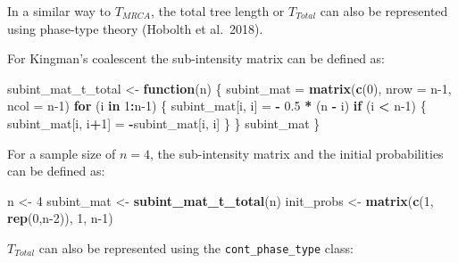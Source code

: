 \documentclass[]{article}
\newenvironment{Shaded}{\begin{snugshade}}{\end{snugshade}}
\newcommand{\ControlFlowTok}[1]{\textcolor[rgb]{0.13,0.29,0.53}{\textbf{#1}}}
\newcommand{\DataTypeTok}[1]{\textcolor[rgb]{0.13,0.29,0.53}{#1}}
\newcommand{\DecValTok}[1]{\textcolor[rgb]{0.00,0.00,0.81}{#1}}
\newcommand{\FloatTok}[1]{\textcolor[rgb]{0.00,0.00,0.81}{#1}}
\newcommand{\KeywordTok}[1]{\textcolor[rgb]{0.13,0.29,0.53}{\textbf{#1}}}
\newcommand{\NormalTok}[1]{#1}
\newcommand{\OperatorTok}[1]{\textcolor[rgb]{0.81,0.36,0.00}{\textbf{#1}}}
\newcommand{\StringTok}[1]{\textcolor[rgb]{0.31,0.60,0.02}{#1}}
\begin{document}
In a similar way to \(T_{MRCA}\), the total tree length or \(T_{Total}\)
can also be represented using phase-type theory (Hobolth et al.~2018).

For Kingman's coalescent the sub-intensity matrix can be defined as:

\begin{Shaded}
\begin{Highlighting}[]

\NormalTok{subint_mat_t_total <-}\StringTok{ }\ControlFlowTok{function}\NormalTok{(n) \{}
\NormalTok{  subint_mat =}\StringTok{ }\KeywordTok{matrix}\NormalTok{(}\KeywordTok{c}\NormalTok{(}\DecValTok{0}\NormalTok{), }\DataTypeTok{nrow =}\NormalTok{ n}\DecValTok{-1}\NormalTok{, }\DataTypeTok{ncol =}\NormalTok{ n}\DecValTok{-1}\NormalTok{)}
  \ControlFlowTok{for}\NormalTok{ (i }\ControlFlowTok{in} \DecValTok{1}\OperatorTok{:}\NormalTok{n}\DecValTok{-1}\NormalTok{) \{}
\NormalTok{    subint_mat[i, i] =}\StringTok{ }\OperatorTok{-}\StringTok{ }\FloatTok{0.5} \OperatorTok{*}\StringTok{ }\NormalTok{(n }\OperatorTok{-}\StringTok{ }\NormalTok{i)}
    \ControlFlowTok{if}\NormalTok{ (i }\OperatorTok{<}\StringTok{ }\NormalTok{n}\DecValTok{-1}\NormalTok{) \{}
\NormalTok{      subint_mat[i, i}\OperatorTok{+}\DecValTok{1}\NormalTok{] =}\StringTok{ }\OperatorTok{-}\NormalTok{subint_mat[i, i]}
\NormalTok{    \}}
\NormalTok{  \}}
\NormalTok{  subint_mat}
\NormalTok{\}}
\end{Highlighting}
\end{Shaded}

For a sample size of \(n=4\), the sub-intensity matrix and the initial
probabilities can be defined as:

\begin{Shaded}
\begin{Highlighting}[]

\NormalTok{n <-}\StringTok{ }\DecValTok{4}
\NormalTok{subint_mat <-}\StringTok{ }\KeywordTok{subint_mat_t_total}\NormalTok{(n)}
\NormalTok{init_probs <-}\StringTok{ }\KeywordTok{matrix}\NormalTok{(}\KeywordTok{c}\NormalTok{(}\DecValTok{1}\NormalTok{, }\KeywordTok{rep}\NormalTok{(}\DecValTok{0}\NormalTok{,n}\DecValTok{-2}\NormalTok{)), }\DecValTok{1}\NormalTok{, n}\DecValTok{-1}\NormalTok{)}
\end{Highlighting}
\end{Shaded}

\(T_{Total}\) can also be represented using the
\texttt{cont\_phase\_type} class:
\end{document}
